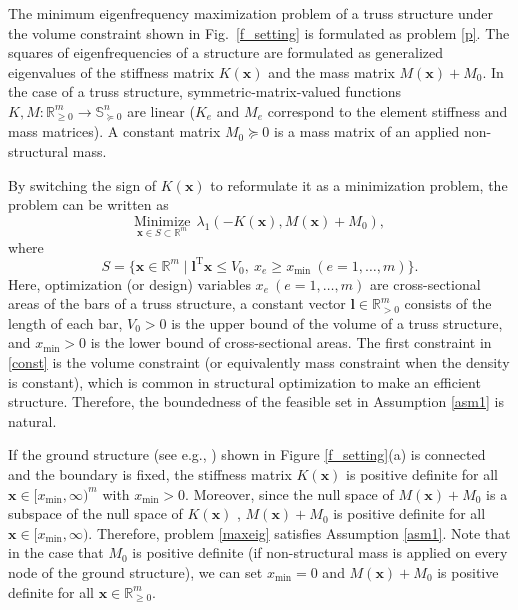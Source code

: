 \documentclass[sn-mathphys,Numbered]{sn-jnl}%
\theoremstyle{thmstyleone}%
\theoremstyle{thmstyletwo}%
\theoremstyle{thmstylethree}%
\newcommand{\e}[1]{\begin{equation}#1\end{equation}}
\def\rm{\mathbb{R}^m}
\def\tp{\mathrm{T}}
\begin{document}
The minimum eigenfrequency maximization problem of a truss structure under the volume constraint \cite{achtziger07siam} shown in Fig.~\ref{f_setting} is formulated as problem \eqref{p}.
The squares of eigenfrequencies of a structure are formulated as generalized eigenvalues of the stiffness matrix $K(\bm{x})$ and the mass matrix $M(\bm{x})+M_0$. In the case of a truss structure, symmetric-matrix-valued functions $K,M:\mathbb{R}^m_{\ge 0}\to\mathbb{S}^n_{\succeq 0}$ are linear ($K_e$ and $M_e$ correspond to the element stiffness and mass matrices). A constant matrix $M_0\succeq0$ is a mass matrix of an applied non-structural mass.

By switching the sign of $K(\bm{x})$ to reformulate it as a minimization problem, the problem can be written as
\e{
\underset{\bm{x}\in S\subset\rm}{\mathrm{Minimize}}\ \ \lambda_1(-K(\bm{x}),M(\bm{x})+M_0),
\label{maxeig}
}
where
\e{
S=\{\bm{x}\in\rm \mid \bm{l}^\tp\bm{x}\le V_0,\ x_e \ge x_{\mathrm{min}}\ (e=1,\ldots,m)\}.
\label{const}
}
Here, optimization (or design) variables $x_e\ (e=1,\ldots,m)$ are cross-sectional areas of the bars of a truss structure, a constant vector $\bm{l}\in\mathbb{R}^m_{>0}$ consists of the length of each bar, $V_0>0$ is the upper bound of the volume of a truss structure, and $x_{\mathrm{min}}>0$ is the lower bound of cross-sectional areas. The first constraint in \eqref{const} is the volume constraint (or equivalently mass constraint when the density is constant), which is common in structural optimization to make an efficient structure. Therefore, the boundedness of the feasible set in Assumption \ref{asm1} is natural.

If the ground structure (see e.g., \cite{achtziger07siam}) shown in Figure \ref{f_setting}(a) is connected and the boundary is fixed, the stiffness matrix $K(\bm{x})$ is positive definite for all $\bm{x}\in[x_{\mathrm{min}},\infty)^m$ with $x_{\mathrm{min}}>0$. Moreover, since the null space of $M(\bm{x})+M_0$ is a subspace of the null space of $K(\bm{x})$ \cite{achtziger07siam}, $M(\bm{x})+M_0$ is positive definite for all $\bm{x}\in[x_{\mathrm{min}},\infty)$. Therefore, problem \eqref{maxeig} satisfies Assumption \ref{asm1}. Note that in the case that $M_0$ is positive definite (if non-structural mass is applied on every node of the ground structure), we can set $x_{\mathrm{min}}=0$ and $M(\bm{x})+M_0$ is positive definite for all $\bm{x}\in\mathbb{R}^m_{\ge 0}$.
\end{document}
